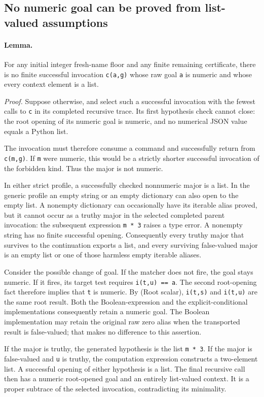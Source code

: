 \documentclass[11pt]{article}
\theoremstyle{definition}\newtheorem{definition}[theorem]{Definition}
\begin{document}
\subsection{No numeric goal can be proved from list-valued assumptions}

\paragraph{Lemma.}
For any initial integer fresh-name floor and any finite remaining
certificate, there is no finite successful invocation
\texttt{c(a,g)} whose raw goal \texttt{a} is numeric and whose every
context element is a list.

\emph{Proof.}
Suppose otherwise, and select such a successful invocation with the
fewest calls to \texttt{c} in its completed recursive trace.  Its first
hypothesis check cannot close: the root opening of its numeric goal is
numeric, and no numerical JSON value equals a Python list.

The invocation must therefore consume a command and successfully return
from \texttt{c(m,g)}.  If \texttt{m} were numeric, this would be a
strictly shorter successful invocation of the forbidden kind.  Thus the
major is not numeric.

In either strict profile, a successfully checked nonnumeric major is a
list.  In the generic profile an empty string or an empty dictionary can
also open to the empty list.  A nonempty dictionary can occasionally
have its iterable alias proved, but it cannot occur as a truthy major
in the selected completed parent invocation: the subsequent expression
\texttt{m * 3} raises a type error.  A nonempty string has no finite
successful opening.  Consequently every truthy major that survives to
the continuation exports a list, and every surviving false-valued
major is an empty list or one of those harmless empty iterable aliases.

Consider the possible change of goal.  If the matcher does not fire,
the goal stays numeric.  If it fires, its target test requires
\texttt{i(t,u) == a}.  The second root-opening fact therefore implies
that \texttt{t} is numeric.  By (Root scalar), \texttt{i(t,s)} and
\texttt{i(t,u)} are the same root result.  Both the Boolean-expression
and the explicit-conditional implementations consequently retain a
numeric goal.  The Boolean implementation may retain the original raw
zero alias when the transported result is false-valued; that makes no
difference to this assertion.

If the major is truthy, the generated hypothesis is the list
\texttt{m * 3}.  If the major is false-valued and \texttt{u} is truthy,
the computation expression constructs a two-element list.  A successful
opening of either hypothesis is a list.  The final recursive call then
has a numeric root-opened goal and an entirely list-valued context.  It
is a proper subtrace of the selected invocation, contradicting its
minimality.
\end{document}
